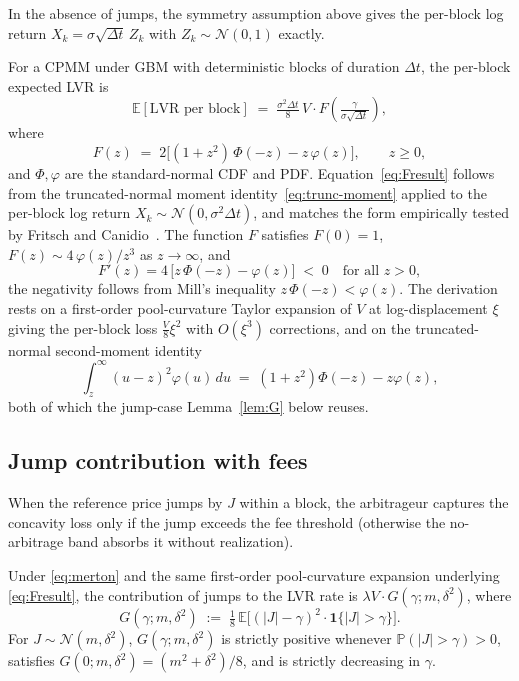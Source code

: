 \documentclass[runningheads]{llncs}
\newcommand{\E}{\mathbb{E}}
\newcommand{\Prob}{\mathbb{P}}
\newcommand{\dt}{\Delta t}
\newcommand{\1}{\mathbf{1}}
\begin{document}
In the absence of jumps, the symmetry assumption above gives the per-block log return $X_k = \sigma\sqrt{\dt}\,Z_k$ with $Z_k \sim \mathcal{N}(0,1)$ exactly.

For a CPMM under GBM with deterministic blocks of duration $\dt$, the per-block expected LVR is
\begin{equation}\label{eq:Fresult}
\E[\text{LVR per block}] \;=\; \tfrac{\sigma^2 \dt}{8}\,V \cdot F\!\left(\tfrac{\gamma}{\sigma\sqrt{\dt}}\right),
\end{equation}
where
\begin{equation}\label{eq:F}
F(z) \;=\; 2\Big[(1+z^2)\,\Phi(-z) - z\,\varphi(z)\Big], \qquad z \geq 0,
\end{equation}
and $\Phi,\varphi$ are the standard-normal CDF and PDF. Equation~\eqref{eq:Fresult} follows from the truncated-normal moment identity~\eqref{eq:trunc-moment} applied to the per-block log return $X_k \sim \mathcal{N}(0,\sigma^2\dt)$, and matches the form empirically tested by Fritsch and Canidio~\cite{fritsch2024measuring}. The function $F$ satisfies $F(0)=1$, $F(z) \sim 4\,\varphi(z)/z^3$ as $z \to \infty$, and
\begin{equation}\label{eq:Fprime}
F'(z) = 4\,\big[z\,\Phi(-z) - \varphi(z)\big] \;<\; 0 \quad \text{for all } z > 0,
\end{equation}
the negativity follows from Mill's inequality $z\,\Phi(-z) < \varphi(z)$. The derivation rests on a first-order pool-curvature Taylor expansion of $V$ at log-displacement $\xi$ giving the per-block loss $\tfrac{V}{8}\xi^2$ with $O(\xi^3)$ corrections, and on the truncated-normal second-moment identity
\begin{equation}\label{eq:trunc-moment}
\int_z^\infty (u - z)^2 \varphi(u)\,du \;=\; (1 + z^2)\Phi(-z) - z\varphi(z),
\end{equation}
both of which the jump-case Lemma~\ref{lem:G} below reuses.

\subsection{Jump contribution with fees}

When the reference price jumps by $J$ within a block, the arbitrageur captures the concavity loss only if the jump exceeds the fee threshold (otherwise the no-arbitrage band absorbs it without realization).

\begin{lemma}\label{lem:G}
Under \eqref{eq:merton} and the same first-order pool-curvature expansion underlying \eqref{eq:Fresult}, the contribution of jumps to the LVR rate is $\lambda V \cdot G(\gamma; m, \delta^2)$, where
\begin{equation}\label{eq:G}
G(\gamma; m, \delta^2) \;:=\; \tfrac{1}{8}\,\E\!\Big[(|J| - \gamma)^2 \cdot \1\{|J| > \gamma\}\Big].
\end{equation}
For $J \sim \mathcal{N}(m,\delta^2)$, $G(\gamma;m,\delta^2)$ is strictly positive whenever $\Prob(|J|>\gamma) > 0$, satisfies $G(0;m,\delta^2) = (m^2 + \delta^2)/8$, and is strictly decreasing in $\gamma$.
\end{lemma}
\end{document}
